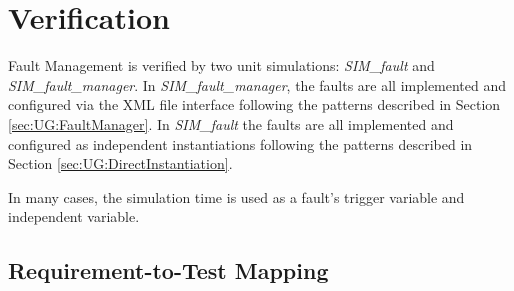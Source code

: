 \documentclass[11pt,fleqn]{report}
\begin{document}
\chapter{Verification}
\par Fault Management is verified by two unit simulations: \textit{SIM\_fault}
and \textit{SIM\_fault\_manager}.
In \textit{SIM\_fault\_manager}, the faults are all implemented and
configured via the XML file interface following the patterns described in
Section \ref{sec:UG:FaultManager}.
In \textit{SIM\_fault} the faults are all implemented and configured as
independent instantiations following the patterns described in Section
\ref{sec:UG:DirectInstantiation}.

In many cases, the simulation time is used as a fault's trigger variable and
independent variable.

\section{ Requirement-to-Test Mapping}
\end{document}
